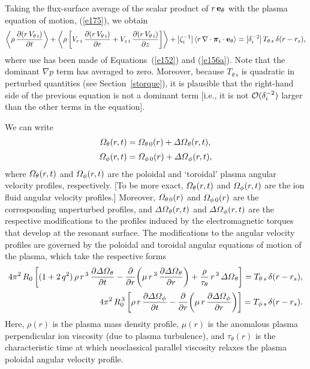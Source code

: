 \documentclass[notitlepage,12pt]{article}
\newcommand{\bpi}{\mbox{\boldmath$\pi$}}
\begin{document}
{Taking the flux-surface average of the scalar product of $r\,{\bf e}_\theta$ with the plasma equation of motion, (\ref{e175}), we obtain 
\begin{equation}
\left\langle\rho\,\frac{\partial (r\,V_{\theta\,i})}{\partial t} \right\rangle 
+\left\langle \rho\left[V_{r\,i}\,\frac{\partial (r\,V_{\theta\,i})}{\partial r} + V_{z\,i}\,\frac{\partial(r\, V_{\theta\,i})}{\partial z}
\right]\right\rangle + [\zeta_i^{-1}]\,\langle r\,\nabla\cdot \bpi_i\cdot{\bf e}_\theta\rangle
= [\delta_i^{-2}]\,T_{\theta\,s}\,\delta(r-r_s),
\end{equation}
where use has been made of Equations~(\ref{e152}) and (\ref{e156a}). Note that the dominant $\nabla p$ term
has averaged to zero. Moreover, because $T_{\theta\,s}$ is quadratic in perturbed quantities (see Section~\ref{storque}), it is plausible that the right-hand side of the previous equation is not a dominant term [i.e., it is not ${\cal O}(\delta_i^{-2})$ larger than the
other terms in the equation]. 


We can write
\begin{align}
{\mit\Omega}_\theta(r,t)&= {\mit\Omega}_{\theta\,0}(r) + {\mit\Delta\Omega}_\theta(r,t),\\[0.5ex]
{\mit\Omega}_\phi(r,t)&= {\mit\Omega}_{\phi\,0}(r) + {\mit\Delta\Omega}_\phi(r,t),
\end{align}
where ${\mit\Omega}_\theta(r,t)$ and ${\mit\Omega}_\phi(r,t)$ are the poloidal and 	`toroidal' plasma angular velocity profiles, respectively. [To be more exact,  ${\mit\Omega}_\theta(r,t)$ and ${\mit\Omega}_\phi(r,t)$ are the ion fluid angular velocity
profiles.] Moreover, ${\mit\Omega}_{\theta\,0}(r)$ and ${\mit\Omega}_{\phi\,0}(r)$ are the corresponding unperturbed profiles,
and ${\mit\Delta\Omega}_{\theta}(r,t)$ and ${\mit\Delta\Omega}_{\phi}(r,t)$ are the respective modifications to the profiles
induced by the electromagnetic torques that develop at the resonant surface. The modifications to the angular
velocity profiles are governed by the poloidal and toroidal angular equations of motion of the plasma, which
take the respective forms
\begin{align}
4\pi^2\,R_0\left[(1+2\,q^2)\,\rho\,r^{\,3}\,\frac{\partial{\mit\Delta\Omega}_\theta}{\partial t}-\frac{\partial}{\partial r}\!\left(
\mu\,r^{\,3}\,\frac{\partial{\mit\Delta\Omega}_\theta}{\partial r}\right) + \frac{\rho}{\tau_\theta}\,r^{\,3}\,{\mit\Delta\Omega}_\theta\right] = T_{\theta\,s}\,\delta(r-r_s),\\[0.5ex]
4\pi^2\,R_0^{\,3}\left[\rho\,r\,\frac{\partial{\mit\Delta\Omega}_\phi}{\partial t}-\frac{\partial}{\partial r}\!\left(
\mu\,r\,\frac{\partial{\mit\Delta\Omega}_\phi}{\partial r}\right) \right] = T_{\phi\,s}\,\delta(r-r_s).
\end{align}
Here, $\rho(r)$ is the plasma mass density profile, $\mu(r)$ is the anomalous plasma perpendicular ion viscosity
(due to plasma turbulence), and $\tau_\theta(r)$ is the characteristic time at which neoclassical
parallel viscosity relaxes the plasma poloidal angular velocity profile. 
  
}
\end{document}
